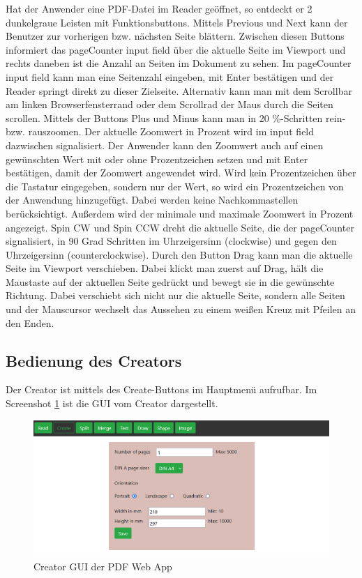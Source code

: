 Hat der Anwender eine PDF-Datei im Reader geöffnet, so entdeckt er 2 dunkelgraue Leisten mit Funktionsbuttons. Mittels Previous und Next kann der Benutzer zur vorherigen bzw. nächsten Seite blättern. Zwischen diesen Buttons informiert das pageCounter input field über die aktuelle Seite im Viewport und rechts daneben ist die Anzahl an Seiten im Dokument zu sehen. Im pageCounter input field kann man eine Seitenzahl eingeben, mit Enter bestätigen und der Reader springt direkt zu dieser Zielseite. Alternativ kann man mit dem Scrollbar am linken Browserfensterrand oder dem Scrollrad der Maus durch die Seiten scrollen. Mittels der Buttons Plus und Minus kann man in 20 \%-Schritten rein- bzw. rauszoomen. Der aktuelle Zoomwert in Prozent wird im input field dazwischen signalisiert. Der Anwender kann den Zoomwert auch auf einen gewünschten Wert mit oder ohne Prozentzeichen setzen und mit Enter bestätigen, damit der Zoomwert angewendet wird. Wird kein Prozentzeichen über die Tastatur eingegeben, sondern nur der Wert, so wird ein Prozentzeichen von der Anwendung hinzugefügt. Dabei werden keine Nachkommastellen berücksichtigt. Außerdem wird der minimale und maximale Zoomwert in Prozent angezeigt. Spin CW und Spin CCW dreht die aktuelle Seite, die der pageCounter signalisiert, in 90 Grad Schritten im Uhrzeigersinn (clockwise) und gegen den Uhrzeigersinn (counterclockwise). Durch den Button Drag kann man die aktuelle Seite im Viewport verschieben. Dabei klickt man zuerst auf Drag, hält die Maustaste auf der aktuellen Seite gedrückt und bewegt sie in die gewünschte Richtung. Dabei verschiebt sich nicht nur die aktuelle Seite, sondern alle Seiten und der Mauscursor wechselt das Aussehen zu einem weißen Kreuz mit Pfeilen an den Enden.

\subsection{Bedienung des Creators}
Der Creator ist mittels des Create-Buttons im Hauptmenü aufrufbar. Im Screenshot \ref{fig:creator} ist die GUI vom Creator dargestellt. 

\begin{figure}[!htbp]
	\centering
	\includegraphics[width=1\textwidth]{"images/creator.png"}
	\caption{Creator GUI der PDF Web App}
	\label{fig:creator}
\end{figure}

